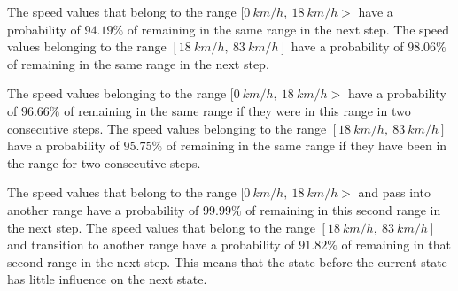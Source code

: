 \documentclass[preprint,12pt]{elsarticle}
\begin{document}
The speed values that belong to the range $[0 \ km/h, \ 18 \ km/h>$ have a probability of $94.19\%$ of remaining in the same range in the next step. The speed values belonging to the range $[18 \ km/h, \ 83 \ km/h]$ have a probability of $98.06\%$ of remaining in the same range in the next step.

The speed values belonging to the range $[0 \ km/h, \ 18 \ km/h>$ have a probability of $96.66\%$ of remaining in the same range if they were in this range in two consecutive steps. The speed values belonging to the range $[18 \ km/h, \ 83 \ km/h]$ have a probability of $95.75\%$ of remaining in the same range if they have been in the range for two consecutive steps.

The speed values that belong to the range $[0 \ km/h, \ 18 \ km/h>$ and pass into another range have a probability of $99.99\%$ of remaining in this second range in the next step. The speed values that belong to the range $[18 \ km/h, \ 83 \ km/h]$ and transition to another range have a probability of $91.82\%$ of remaining in that second range in the next step. This means that the state before the current state has little influence on the next state.
\end{document}
